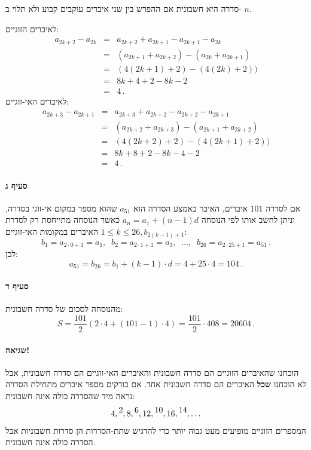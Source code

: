 \documentclass[12pt,a4paper]{article}
\begin{document}
סדרה היא חשבונית אם ההפרש בין שני איברים עוקבים קבוע ולא תלוי ב-
$n$.

לאיברים הזוגיים:
\begin{eqnarray*}
a_{2k+2} - a_{2k} &=& a_{2k+2} + a_{2k+1} - a_{2k+1} - a_{2k}\\
&=& (a_{2k+1} + a_{2k+2}) - (a_{2k} + a_{2k+1})\\
&=&(4(2k+1)+2) - (4(2k)+2))\\
&=&8k+4+2-8k-2\\
&=&4\,.
\end{eqnarray*}
לאיברים האי-זוגיים:
\begin{eqnarray*}
a_{2k+3} - a_{2k+1} &=& a_{2k+3} + a_{2k+2} - a_{2k+2} - a_{2k+1}\\
&=& (a_{2k+2} + a_{2k+3}) - (a_{2k+1} + a_{2k+2})\\
&=&(4(2k+2)+2) - (4(2k+1)+2))\\
&=&8k+8+2-8k-4-2\\
&=&4\,.
\end{eqnarray*}

\paragraph{סעיף ג}
אם לסדרה
$101$
איברים, האיבר באמצע הסדרה הוא
$a_{51}$
שהוא מספר במקום אי-זוגי בסדרה, וניתן לחשב אותו לפי הנוסחה
$a_n=a_1+(n-1)d$
כאשר הנוסחה מתייחסת רק לסדרת האיברים במקומות האי-זוגיים
$1\leq k \leq 26, b_{2(k-1)+1}$:
\[
b_1 = a_{2\cdot 0+1}=a_1, \;\; b_2 = a_{2\cdot 1+1}=a_3, \;\;\ldots,\;\; b_{26} = a_{2\cdot 25+1}=a_{51}\,.
\]
לכן:
\[
a_{51}=b_{26}=b_1 + (k-1)\cdot d = 4 + 25\cdot 4 = 104\,.
\]

\vspace{-4ex}\paragraph{סעיף ד}

מהנוסחה לסכום של סדרה חשבונית:
\[
S = \frac{101}{2}(2\cdot 4 + (101-1)\cdot 4) = \frac{101}{2}\cdot 408 = 20604\,.
\]

\vspace{-4ex}\paragraph{שגיאה!}
הוכחנו שהאיברים הזוגיים הם סדרה חשבונית והאיברים האי-זוגיים הם סדרה חשבונית, אבל לא הוכחנו \textbf{שכל} האיברים הם סדרה חשבונית אחד. אם בודקים מספר איברים מתחילת הסדרה נראה מיד שהסדרה כולה אינה חשבונית:
\begin{equation}
4, \raisebox{1ex}{$2$}, 8, \raisebox{1ex}{$6$}, 12, \raisebox{1ex}{$10$}, 16, \raisebox{1ex}{$14$}, \ldots \label{e.even-odd}
\end{equation}
המספרים הזוגיים מופיעים מעט גבוה יותר כדי להדגיש שתת-הסדרות הן סדרות חשבוניות אבל הסדרה כולה אינה חשבונית.
\end{document}
